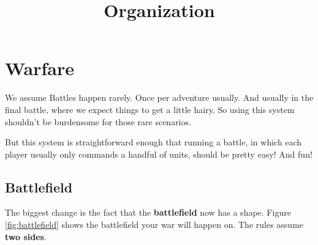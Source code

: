\documentclass[letterpaper,twocolumn,openany,nodeprecatedcode]{dndbook}
\title{Organization}
\author{}
\date{}
\begin{document}




\footnotesize

\begingroup
\DndSetThemeColor[PhbMauve]

\section{Warfare}






We assume Battles happen rarely. Once per adventure usually. And usually in the final battle, where we expect things to get a little hairy. So using this system shouldn’t be burdensome for those rare scenarios.

But this system is straightforward enough that running a battle, in which each player usually only commands a handful of units, should be pretty easy! And fun!

\subsection{Battlefield}

The biggest change is the fact that the \textbf{battlefield} now has a shape.
Figure \ref{fig:battlefield} shows the battlefield your war will happen on. The rules assume \textbf{two sides}.
\end{document}
